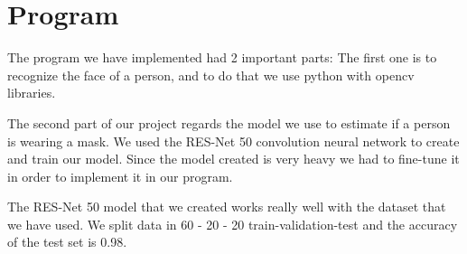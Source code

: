 \section{Program} 
The program we have implemented had 2 important parts: 
The first one is to recognize the face of a person, and to do that we use python with opencv libraries.

The second part of our project regards the model we use to estimate if a person is wearing a mask. We used the RES-Net 50 convolution neural network to create and train our model. Since the model created is very heavy we had to fine-tune it in order to implement it in our program.

The RES-Net 50 model that we created works really well with the dataset that we have used. We split data in 60 - 20 - 20 train-validation-test and the accuracy of the test set is 0.98.
